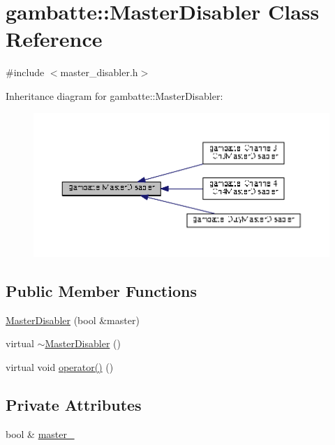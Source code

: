 \hypertarget{classgambatte_1_1MasterDisabler}{}\section{gambatte\+:\+:Master\+Disabler Class Reference}
\label{classgambatte_1_1MasterDisabler}


{\ttfamily \#include $<$master\+\_\+disabler.\+h$>$}



Inheritance diagram for gambatte\+:\+:Master\+Disabler\+:
\nopagebreak
\begin{figure}[H]
\begin{center}
\leavevmode
\includegraphics[width=350pt]{classgambatte_1_1MasterDisabler__inherit__graph}
\end{center}
\end{figure}
\subsection*{Public Member Functions}
\begin{DoxyCompactItemize}
\item 
\hyperlink{classgambatte_1_1MasterDisabler_ab99180b369a016f453ea9b8590821503}{Master\+Disabler} (bool \&master)
\item 
virtual \hyperlink{classgambatte_1_1MasterDisabler_ac8ac2094532c4247348557c518f68cce}{$\sim$\+Master\+Disabler} ()
\item 
virtual void \hyperlink{classgambatte_1_1MasterDisabler_a6b69f64af3e8112eac3767a74ee0e322}{operator()} ()
\end{DoxyCompactItemize}
\subsection*{Private Attributes}
\begin{DoxyCompactItemize}
\item 
bool \& \hyperlink{classgambatte_1_1MasterDisabler_ae2cb1d8720294d0f32eba06d93483a06}{master\+\_\+}
\end{DoxyCompactItemize}


